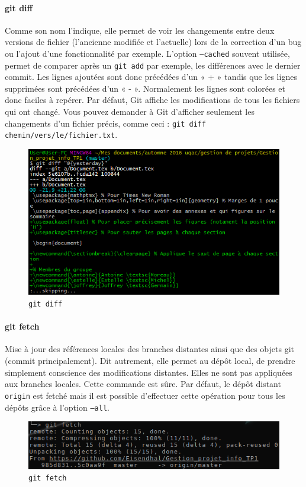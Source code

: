 \documentclass[11pt,canadien]{article}
\begin{document}
\paragraph{git diff}Comme son nom l’indique, elle permet de voir les changements entre deux versions de fichier (l’ancienne modifiée et l’actuelle) lors de la correction d’un bug ou l’ajout d’une fonctionnalité par exemple. L'option \texttt{--cached} souvent utilisée, permet de comparer après un \texttt{git add} par exemple, les différences avec le dernier commit. Les lignes ajoutées sont donc précédées d’un « + » tandis que les lignes supprimées sont précédées d’un « - ». Normalement les lignes sont colorées et donc faciles à repérer. Par défaut, Git affiche les modifications de tous les fichiers qui ont changé. Vous pouvez demander à Git d’afficher seulement les changements d’un fichier précis, comme ceci : \texttt{git diff chemin/vers/le/fichier.txt}.
\begin{figure}
	\centering
	\includegraphics{images/git_diff.png}
	\caption{\texttt{git diff}}
	\label{fig:git_diff}
\end{figure}

\paragraph{git fetch}Mise à jour des références locales des branches distantes ainsi que des objets git (commit principalement). Dit autrement, elle permet au dépôt local, de prendre simplement conscience des modifications distantes. Elles ne sont pas appliquées aux branches locales. Cette commande est sûre. Par défaut, le dépôt distant \texttt{origin} est fetché mais il est possible d'effectuer cette opération pour tous les dépôts grâce à l'option \texttt{--all}.
\begin{figure}
	\centering
	\includegraphics{images/git_fetch.png}
	\caption{\texttt{git fetch}}
	\label{fig:git_fetch}
\end{figure}
\end{document}
